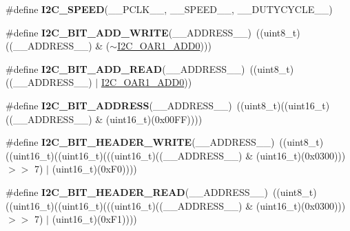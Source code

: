 \begin{DoxyCompactItemize}
\item 
\#define {\bfseries I2\+C\+\_\+\+S\+P\+E\+ED}(\+\_\+\+\_\+\+P\+C\+L\+K\+\_\+\+\_\+,  \+\_\+\+\_\+\+S\+P\+E\+E\+D\+\_\+\+\_\+,  \+\_\+\+\_\+\+D\+U\+T\+Y\+C\+Y\+C\+L\+E\+\_\+\+\_\+)
\item 
\#define {\bfseries I2\+C\+\_\+B\+I\+T\+\_\+\+A\+D\+D\+\_\+\+W\+R\+I\+TE}(\+\_\+\+\_\+\+A\+D\+D\+R\+E\+S\+S\+\_\+\+\_\+)~((uint8\+\_\+t)((\+\_\+\+\_\+\+A\+D\+D\+R\+E\+S\+S\+\_\+\+\_\+) \& ($\sim$\hyperlink{group___peripheral___registers___bits___definition_ga8b7c20c81f79d17921718412b8fca6d7}{I2\+C\+\_\+\+O\+A\+R1\+\_\+\+A\+D\+D0})))\hypertarget{group___i2_c___private___macros_gad83949bd18eca67258b05763a90d0128}{}\label{group___i2_c___private___macros_gad83949bd18eca67258b05763a90d0128}

\item 
\#define {\bfseries I2\+C\+\_\+B\+I\+T\+\_\+\+A\+D\+D\+\_\+\+R\+E\+AD}(\+\_\+\+\_\+\+A\+D\+D\+R\+E\+S\+S\+\_\+\+\_\+)~((uint8\+\_\+t)((\+\_\+\+\_\+\+A\+D\+D\+R\+E\+S\+S\+\_\+\+\_\+) $\vert$ \hyperlink{group___peripheral___registers___bits___definition_ga8b7c20c81f79d17921718412b8fca6d7}{I2\+C\+\_\+\+O\+A\+R1\+\_\+\+A\+D\+D0}))\hypertarget{group___i2_c___private___macros_gacec6f0d6fde48a24327d2db15387fed8}{}\label{group___i2_c___private___macros_gacec6f0d6fde48a24327d2db15387fed8}

\item 
\#define {\bfseries I2\+C\+\_\+B\+I\+T\+\_\+\+A\+D\+D\+R\+E\+SS}(\+\_\+\+\_\+\+A\+D\+D\+R\+E\+S\+S\+\_\+\+\_\+)~((uint8\+\_\+t)((uint16\+\_\+t)((\+\_\+\+\_\+\+A\+D\+D\+R\+E\+S\+S\+\_\+\+\_\+) \& (uint16\+\_\+t)(0x00\+F\+F))))\hypertarget{group___i2_c___private___macros_ga51ad2b93ef13577d3d437507e09191cd}{}\label{group___i2_c___private___macros_ga51ad2b93ef13577d3d437507e09191cd}

\item 
\#define {\bfseries I2\+C\+\_\+B\+I\+T\+\_\+\+H\+E\+A\+D\+E\+R\+\_\+\+W\+R\+I\+TE}(\+\_\+\+\_\+\+A\+D\+D\+R\+E\+S\+S\+\_\+\+\_\+)~((uint8\+\_\+t)((uint16\+\_\+t)((uint16\+\_\+t)(((uint16\+\_\+t)((\+\_\+\+\_\+\+A\+D\+D\+R\+E\+S\+S\+\_\+\+\_\+) \& (uint16\+\_\+t)(0x0300))) $>$$>$ 7) $\vert$ (uint16\+\_\+t)(0x\+F0))))\hypertarget{group___i2_c___private___macros_ga0edd591eaa2ce5511148bf1ebf533e1a}{}\label{group___i2_c___private___macros_ga0edd591eaa2ce5511148bf1ebf533e1a}

\item 
\#define {\bfseries I2\+C\+\_\+B\+I\+T\+\_\+\+H\+E\+A\+D\+E\+R\+\_\+\+R\+E\+AD}(\+\_\+\+\_\+\+A\+D\+D\+R\+E\+S\+S\+\_\+\+\_\+)~((uint8\+\_\+t)((uint16\+\_\+t)((uint16\+\_\+t)(((uint16\+\_\+t)((\+\_\+\+\_\+\+A\+D\+D\+R\+E\+S\+S\+\_\+\+\_\+) \& (uint16\+\_\+t)(0x0300))) $>$$>$ 7) $\vert$ (uint16\+\_\+t)(0x\+F1))))\hypertarget{group___i2_c___private___macros_ga8d833802aafa40a959f62965e498108c}{}\label{group___i2_c___private___macros_ga8d833802aafa40a959f62965e498108c}


\end{DoxyCompactItemize}
